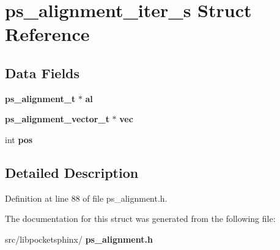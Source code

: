 \section{ps\+\_\+alignment\+\_\+iter\+\_\+s Struct Reference}
\label{structps__alignment__iter__s}
\subsection*{Data Fields}
\begin{DoxyCompactItemize}
\item 
\mbox{\label{structps__alignment__iter__s_a853af3f467b7b3e1465f0f1ea273ff3b}} 
\textbf{ ps\+\_\+alignment\+\_\+t} $\ast$ {\bfseries al}
\item 
\mbox{\label{structps__alignment__iter__s_abeb4cf9260af4c9ad8d9ee7ba93dec14}} 
\textbf{ ps\+\_\+alignment\+\_\+vector\+\_\+t} $\ast$ {\bfseries vec}
\item 
\mbox{\label{structps__alignment__iter__s_a0d993e2df741893ac15b8e84bac32ca6}} 
int {\bfseries pos}
\end{DoxyCompactItemize}


\subsection{Detailed Description}


Definition at line 88 of file ps\+\_\+alignment.\+h.



The documentation for this struct was generated from the following file\+:\begin{DoxyCompactItemize}
\item 
src/libpocketsphinx/\textbf{ ps\+\_\+alignment.\+h}\end{DoxyCompactItemize}
